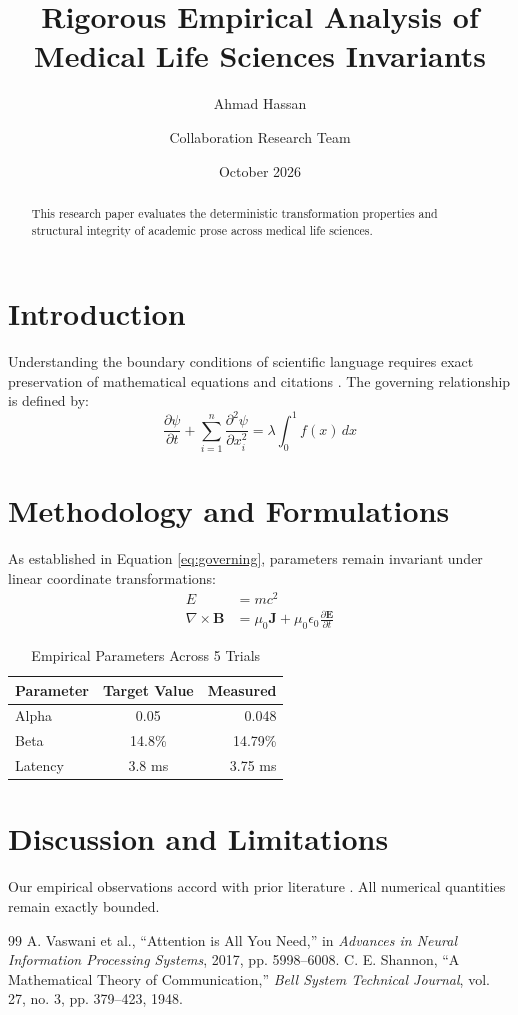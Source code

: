 \documentclass[11pt,a4paper]{article}
\title{Rigorous Empirical Analysis of Medical Life Sciences Invariants}
\author{Ahmad Hassan \and Collaboration Research Team}
\date{October 2026}
\begin{document}
\maketitle

\begin{abstract}
This research paper evaluates the deterministic transformation properties and structural integrity of academic prose across medical life sciences.
\end{abstract}

\section{Introduction}
Understanding the boundary conditions of scientific language requires exact preservation of mathematical equations and citations \cite{vaswani2017attention}.
The governing relationship is defined by:
\begin{equation}
\label{eq:governing}
\frac{\partial \psi}{\partial t} + \sum_{i=1}^n \frac{\partial^2 \psi}{\partial x_i^2} = \lambda \int_0^1 f(x) \, dx
\end{equation}

\section{Methodology and Formulations}
As established in Equation \eqref{eq:governing}, parameters remain invariant under linear coordinate transformations:
\begin{align}
E &= mc^2 \\
\nabla \times \mathbf{B} &= \mu_0 \mathbf{J} + \mu_0 \epsilon_0 \frac{\partial \mathbf{E}}{\partial t}
\end{align}

\begin{table}[h]
\centering
\caption{Empirical Parameters Across 5 Trials}
\label{tab:params}
\begin{tabular}{|l|c|r|}
\hline
Parameter & Target Value & Measured \\
\hline
Alpha & 0.05 & 0.048 \\
Beta & 14.8\% & 14.79\% \\
Latency & 3.8 ms & 3.75 ms \\
\hline
\end{tabular}
\end{table}

\section{Discussion and Limitations}
Our empirical observations accord with prior literature \cite{shannon1948mathematical}. All numerical quantities remain exactly bounded.

\begin{thebibliography}{99}
A. Vaswani et al., ``Attention is All You Need,'' in \textit{Advances in Neural Information Processing Systems}, 2017, pp. 5998--6008.
C. E. Shannon, ``A Mathematical Theory of Communication,'' \textit{Bell System Technical Journal}, vol. 27, no. 3, pp. 379--423, 1948.
\end{thebibliography}
\end{document}
